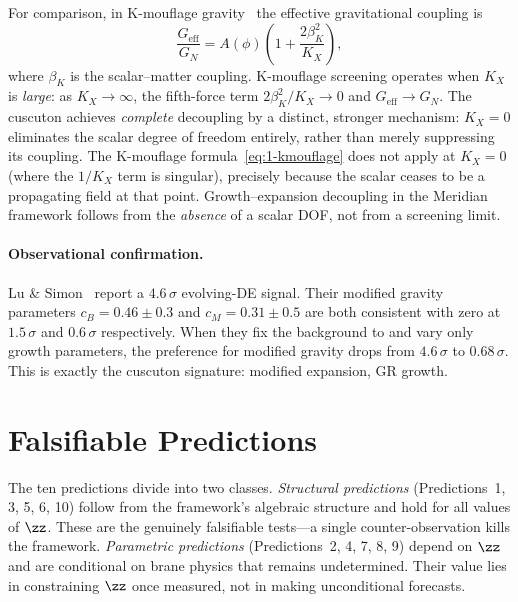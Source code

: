 For comparison, in K-mouflage gravity~\cite{ch1:bose-kmouflage} the effective gravitational coupling is
\begin{equation}
\label{eq:1-kmouflage}
\frac{G_{\mathrm{eff}}}{G_N} = A(\phi)\left(1 + \frac{2\beta_K^2}{K_X}\right)\!,
\end{equation}
where $\beta_K$ is the scalar--matter coupling. K-mouflage screening operates when $K_X$ is \emph{large}: as $K_X \to \infty$, the fifth-force term $2\beta_K^2/K_X \to 0$ and $G_{\mathrm{eff}} \to G_N$. The cuscuton achieves \emph{complete} decoupling by a distinct, stronger mechanism: $K_X = 0$ eliminates the scalar degree of freedom entirely, rather than merely suppressing its coupling. The K-mouflage formula~\eqref{eq:1-kmouflage} does not apply at $K_X = 0$ (where the $1/K_X$ term is singular), precisely because the scalar ceases to be a propagating field at that point. Growth--expansion decoupling in the Meridian framework follows from the \emph{absence} of a scalar DOF, not from a screening limit.

\paragraph{Observational confirmation.} Lu \& Simon~\cite{ch1:lu-simon} report a $4.6\,\sigma$ evolving-DE signal. Their modified gravity parameters $c_B = 0.46 \pm 0.3$ and $c_M = 0.31 \pm 0.5$ are both consistent with zero at $1.5\,\sigma$ and $0.6\,\sigma$ respectively. When they fix the background to \LCDM{} and vary only growth parameters, the preference for modified gravity drops from $4.6\,\sigma$ to $0.68\,\sigma$. This is exactly the cuscuton signature: modified expansion, GR growth.


\section{Falsifiable Predictions}
\label{sec:1-predictions}

The ten predictions divide into two classes. \emph{Structural predictions} (Predictions~1, 3, 5, 6, 10) follow from the framework's algebraic structure and hold for all values of $\zz$. These are the genuinely falsifiable tests---a single counter-observation kills the framework. \emph{Parametric predictions} (Predictions~2, 4, 7, 8, 9) depend on $\zz$ and are conditional on brane physics that remains undetermined. Their value lies in constraining $\zz$ once measured, not in making unconditional forecasts.

